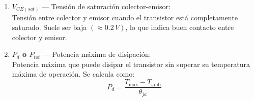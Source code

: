 \begin{itemize}
\begin{enumerate}
                \item \textbf{$V_{CE(sat)}$} — Tensión de saturación colector-emisor: \\
                Tensión entre colector y emisor cuando el transistor está completamente saturado. Suele ser baja $(≈ 0.2\,V)$, lo que indica buen contacto entre colector y emisor.
            
                \item \textbf{$P_d$ o $P_{tot}$} — Potencia máxima de disipación: \\
                Potencia máxima que puede disipar el transistor sin superar su temperatura máxima de operación. Se calcula como:
                \[
                P_{d} = \frac{T_{\text{max}} - T_{\text{amb}}}{\theta_{ja}}
                \]
                \end{enumerate}

        \end{itemize}

\newpage

